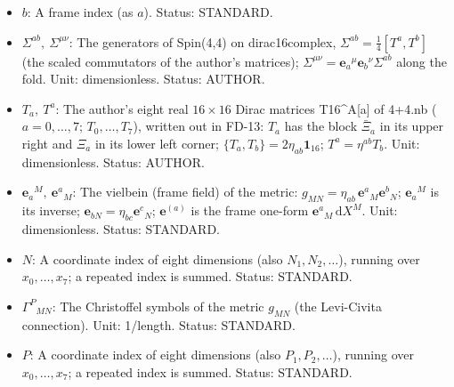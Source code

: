 \documentclass[
  10pt,
]{article}
\begin{document}
\begin{itemize}
  (frame direction \((0)\) along \(\sigma\), \((1), (2), (3)\) along
  ordinary space, \((4)\) along the time, \((5), (6), (7)\) along the
  extra times); raised and lowered with the frame metric
  \(\eta_{ab} = \mathrm{diag}(1, 1, 1, 1, -1, -1, -1, -1)\); on the fold
  (\(a, b \in \{1, \dots, 7\}\)) the frame of the fold; in the tensors
  of the fold written with its coordinates \(x^a\) (its metric
  \(\hat g_{ab}\) and the tensors built from it) a coordinate index of
  the fold, \(a \in \{1, \dots, 7\}\); a repeated index is summed.
  Status: STANDARD.
\item
  \(b\): A frame index (as \(a\)). Status: STANDARD.
\item
  \(\Sigma^{ab},\ \Sigma^{\mu\nu}\): The generators of Spin(4,4) on
  dirac16complex, \(\Sigma^{ab} = \frac14[T^a, T^b]\) (the scaled
  commutators of the author's matrices);
  \(\Sigma^{\mu\nu} = \mathbf{e}_a{}^\mu\mathbf{e}_b{}^\nu\Sigma^{ab}\)
  along the fold. Unit: dimensionless. Status: AUTHOR.
\item
  \(T_a,\ T^a\): The author's eight real \(16 \times 16\) Dirac matrices
  T16\^{}A{[}a{]} of 4+4.nb (\(a = 0, \dots, 7\); \(T_0, \dots, T_7\)),
  written out in FD-13: \(T_a\) has the block \(\bar\Xi_a\) in its upper
  right and \(\Xi_a\) in its lower left corner;
  \(\{T_a, T_b\} = 2\eta_{ab}\mathbf{1}_{16}\); \(T^a = \eta^{ab}T_b\).
  Unit: dimensionless. Status: AUTHOR.
\item
  \(\mathbf{e}_a{}^M,\ \mathbf{e}^a{}_M\): The vielbein (frame field) of
  the metric: \(g_{MN} = \eta_{ab}\,\mathbf{e}^a{}_M\mathbf{e}^b{}_N\);
  \(\mathbf{e}_a{}^M\) is its inverse;
  \(\mathbf{e}_{bN} = \eta_{bc}\mathbf{e}^c{}_N\); \(\mathbf{e}^{(a)}\)
  is the frame one-form \(\mathbf{e}^a{}_M\,\mathrm{d}X^M\). Unit:
  dimensionless. Status: STANDARD.
\item
  \(N\): A coordinate index of eight dimensions (also
  \(N_1, N_2, \dots\)), running over \(x_0, \dots, x_7\); a repeated
  index is summed. Status: STANDARD.
\item
  \(\Gamma^P{}_{MN}\): The Christoffel symbols of the metric \(g_{MN}\)
  (the Levi-Civita connection). Unit: 1/length. Status: STANDARD.
\item
  \(P\): A coordinate index of eight dimensions (also
  \(P_1, P_2, \dots\)), running over \(x_0, \dots, x_7\); a repeated
  index is summed. Status: STANDARD.
\end{itemize}
\end{document}
